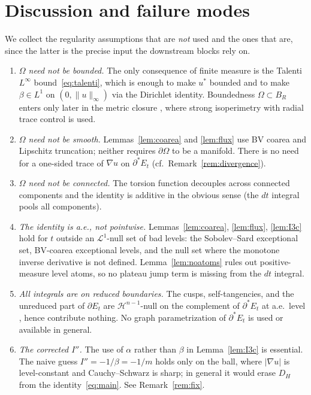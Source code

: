 \documentclass[11pt]{article}
\theoremstyle{definition}
\newcommand{\Om}{\Omega}
\begin{document}
\section{Discussion and failure modes}\label{sec:discussion}

We collect the regularity assumptions that are \emph{not} used and the
ones that are, since the latter is the precise input the downstream
blocks rely on.

\begin{enumerate}
\item \emph{$\Om$ need not be bounded.} The only consequence of finite
measure is the Talenti $L^{\infty}$ bound~\eqref{eq:talenti}, which is
enough to make $u^{*}$ bounded and to make $\beta\in L^{1}$ on
$(0,\|u\|_{\infty})$ via the Dirichlet identity. Boundedness
$\Om\subset B_{R}$ enters only later in the metric closure
\cite{MetricFramework,WeightedMetricTrace}, where strong isoperimetry
with radial trace control is used.

\item \emph{$\Om$ need not be smooth.} Lemmas~\ref{lem:coarea} and
\ref{lem:flux} use BV coarea and Lipschitz truncation; neither requires
$\partial\Om$ to be a manifold. There is no need for a one-sided trace
of $\nabla u$ on $\partial^{*}E_{t}$ (cf.\ Remark~\ref{rem:divergence}).

\item \emph{$\Om$ need not be connected.} The torsion function
decouples across connected components and the identity is additive in
the obvious sense (the $dt$ integral pools all components).

\item \emph{The identity is a.e., not pointwise.} Lemmas~\ref{lem:coarea},
\ref{lem:flux}, \ref{lem:I3c} hold for $t$ outside an $\mathcal L^{1}$-null
set of bad levels: the Sobolev--Sard exceptional set, BV-coarea
exceptional levels, and the null set where the monotone inverse
derivative is not defined.  Lemma~\ref{lem:noatoms} rules out
positive-measure level atoms, so no plateau jump term is missing from
the $dt$ integral.

\item \emph{All integrals are on reduced boundaries.} The cusps,
self-tangencies, and the unreduced part of $\partial E_{t}$ are
$\mathcal H^{n-1}$-null on the complement of $\partial^{*}E_{t}$ at
a.e.\ level \cite{DeGiorgi1958, Maggi2012}, hence contribute nothing.
No graph parametrization of $\partial^{*}E_{t}$ is used or available
in general.

\item \emph{The corrected $I''$.} The use of $\alpha$ rather than
$\beta$ in Lemma~\ref{lem:I3c} is essential. The naive guess
$I''=-1/\beta=-1/m$ holds only on the ball, where $|\nabla u|$ is
level-constant and Cauchy--Schwarz is sharp; in general it would erase
$D_{H}$ from the identity~\eqref{eq:main}. See Remark~\ref{rem:fix}.
\end{enumerate}
\end{document}
